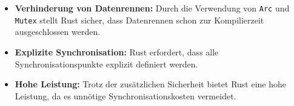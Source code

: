 \begin{itemize}
\item \textbf{Verhinderung von Datenrennen:} Durch die Verwendung von \texttt{Arc} und \texttt{Mutex} stellt Rust sicher, dass Datenrennen schon zur Kompilierzeit ausgeschlossen werden.
\item \textbf{Explizite Synchronisation:} Rust erfordert, dass alle Synchronisationspunkte explizit definiert werden.
\item \textbf{Hohe Leistung:} Trotz der zusätzlichen Sicherheit bietet Rust eine hohe Leistung, da es unnötige Synchronisationskosten vermeidet.
\end{itemize}
\noindent

